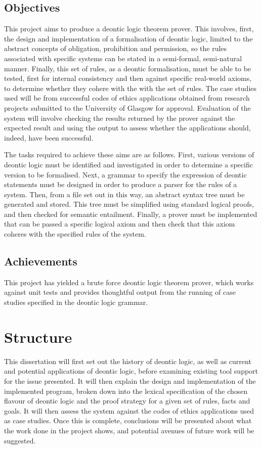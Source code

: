 \documentclass{l4proj}
\begin{document}
\subsection{Objectives}
This project aims to produce a deontic logic theorem prover. This involves, first, the design and implementation of a formalisation of deontic logic, limited to the abstract concepts of obligation, prohibition and permission, so the rules associated with specific systems can be stated in a semi-formal, semi-natural manner. Finally, this set of rules, as a deontic formalisation, must be able to be tested, first for internal consistency and then against specific real-world axioms, to determine whether they cohere with the with the set of rules. The case studies used will be from successful codes of ethics applications obtained from research projects submitted to the University of Glasgow for approval. Evaluation of the system will involve checking the results returned by the prover against the expected result and using the output to assess whether the applications should, indeed, have been successful. 

The tasks required to achieve these aims are as follows. First, various versions of deontic logic must be identified and investigated in order to determine a specific version to be formalised. Next, a grammar to specify the expression of deontic statements must be designed in order to produce a parser for the rules of a system. Then, from a file set out in this way, an abstract syntax tree must be generated and stored. This tree must be simplified using standard logical proofs, and then checked for semantic entailment. Finally, a prover must be implemented that can be passed a specific logical axiom and then check that this axiom coheres with the specified rules of the system.

\subsection{Achievements}
This project has yielded a brute force deontic logic theorem prover, which works against unit tests and provides thoughtful output from the running of case studies specified in the deontic logic grammar. 

\section{Structure}
This dissertation will first set out the history of deontic logic, as well as current and potential applications of deontic logic, before examining existing tool support for the issue presented. It will then explain the design and implementation of the implemented program, broken down into the lexical specification of the chosen flavour of deontic logic and the proof strategy for a given set of rules, facts and goals. It will then assess the system against the codes of ethics applications used as case studies. Once this is complete, conclusions will be presented about what the work done in the project shows, and potential avenues of future work will be suggested. 
\end{document}
